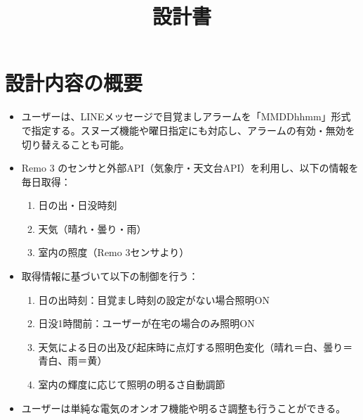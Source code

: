 \documentclass{jarticle}
\title{設計書}
\begin{document}
\date{}
\maketitle

\section*{設計内容の概要}
\begin{itemize}
    \item ユーザーは、LINEメッセージで目覚ましアラームを「MMDDhhmm」形式で指定する。スヌーズ機能や曜日指定にも対応し、アラームの有効・無効を切り替えることも可能。\\
    \item Remo 3 のセンサと外部API（気象庁・天文台API）を利用し、以下の情報を毎日取得：\\
        \begin{enumerate}
            \item 日の出・日没時刻\\
            \item 天気（晴れ・曇り・雨）\\
            \item 室内の照度（Remo 3センサより）\\
        \end{enumerate}
    \item 取得情報に基づいて以下の制御を行う：\\
        \begin{enumerate}
            \item 日の出時刻：目覚まし時刻の設定がない場合照明ON\\
            \item 日没1時間前：ユーザーが在宅の場合のみ照明ON\\
            \item 天気による日の出及び起床時に点灯する照明色変化（晴れ＝白、曇り＝青白、雨＝黄）\\
            \item 室内の輝度に応じて照明の明るさ自動調節\\
        \end{enumerate}
    \item ユーザーは単純な電気のオンオフ機能や明るさ調整も行うことができる。
\end{itemize}
\end{document}

